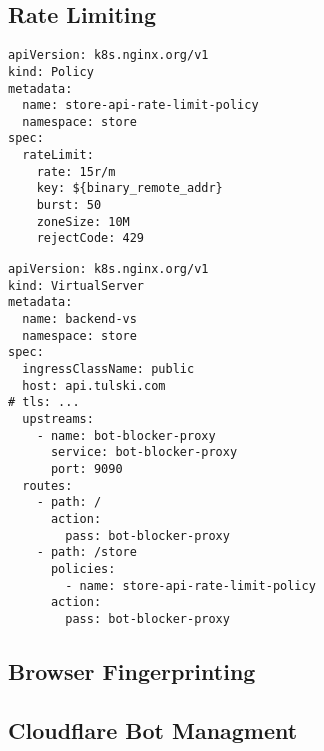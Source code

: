 \newpage

\subsection{Rate Limiting}


\begin{figure*}[p]
    \begin{listing}[H]
        \begin{verbatim}
apiVersion: k8s.nginx.org/v1
kind: Policy
metadata:
  name: store-api-rate-limit-policy
  namespace: store
spec:
  rateLimit:
    rate: 15r/m
    key: ${binary_remote_addr}
    burst: 50
    zoneSize: 10M
    rejectCode: 429
        \end{verbatim}
        \caption{}
        \label{lst:rate-limiting-policy}
    \end{listing}

    \begin{listing}[H]
        \begin{verbatim}
apiVersion: k8s.nginx.org/v1
kind: VirtualServer
metadata:
  name: backend-vs
  namespace: store
spec:
  ingressClassName: public
  host: api.tulski.com
# tls: ...
  upstreams:
    - name: bot-blocker-proxy
      service: bot-blocker-proxy
      port: 9090
  routes:
    - path: /
      action:
        pass: bot-blocker-proxy
    - path: /store
      policies:
        - name: store-api-rate-limit-policy
      action:
        pass: bot-blocker-proxy
        \end{verbatim}
        \caption{}
        \label{lst:rate-limiting-virtual-server}
    \end{listing}
\end{figure*}

\newpage

\subsection{Browser Fingerprinting}


\newpage

\subsection{Cloudflare Bot Managment}

